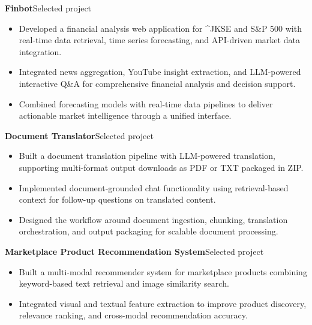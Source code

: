\textbf{Finbot}\hfill {\color{SecondaryText}\small Selected project}\par
\begin{itemize}
  \item Developed a financial analysis web application for \^{}JKSE and S\&P 500 with real-time data retrieval, time series forecasting, and API-driven market data integration.
  \item Integrated news aggregation, YouTube insight extraction, and LLM-powered interactive Q\&A for comprehensive financial analysis and decision support.
  \item Combined forecasting models with real-time data pipelines to deliver actionable market intelligence through a unified interface.
\end{itemize}

\textbf{Document Translator}\hfill {\color{SecondaryText}\small Selected project}\par
\begin{itemize}
  \item Built a document translation pipeline with LLM-powered translation, supporting multi-format output downloads as PDF or TXT packaged in ZIP.
  \item Implemented document-grounded chat functionality using retrieval-based context for follow-up questions on translated content.
  \item Designed the workflow around document ingestion, chunking, translation orchestration, and output packaging for scalable document processing.
\end{itemize}

\textbf{Marketplace Product Recommendation System}\hfill {\color{SecondaryText}\small Selected project}\par
\begin{itemize}
  \item Built a multi-modal recommender system for marketplace products combining keyword-based text retrieval and image similarity search.
  \item Integrated visual and textual feature extraction to improve product discovery, relevance ranking, and cross-modal recommendation accuracy.
\end{itemize}

